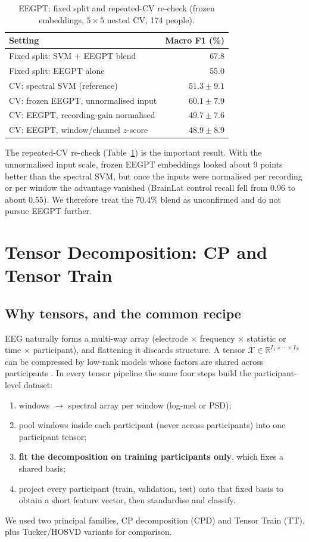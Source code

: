 \documentclass[10pt,twocolumn,a4paper]{article}
\begin{document}
\begin{table}[t]
\centering\small
\caption{EEGPT: fixed split and repeated-CV re-check (frozen embeddings, $5{\times}5$ nested CV, 174 people).}
\label{tab:eegpt}
\begin{tabular}{@{}lr@{}}
\toprule
Setting & Macro F1 (\%)\\
\midrule
Fixed split: SVM + EEGPT blend & 67.8\\
Fixed split: EEGPT alone & 55.0\\
\midrule
CV: spectral SVM (reference) & $51.3\pm9.1$\\
CV: frozen EEGPT, unnormalised input & $60.1\pm7.9$\\
CV: EEGPT, recording-gain normalised & $49.7\pm7.6$\\
CV: EEGPT, window/channel $z$-score & $48.9\pm8.9$\\
\bottomrule
\end{tabular}
\end{table}

The repeated-CV re-check (Table~\ref{tab:eegpt}) is the important result. With the unnormalised input scale, frozen EEGPT embeddings looked about 9 points better than the spectral SVM, but once the inputs were normalised per recording or per window the advantage vanished (BrainLat control recall fell from $0.96$ to about $0.55$). We therefore treat the $70.4\%$ blend as unconfirmed and do not pursue EEGPT further.

\section{Tensor Decomposition: CP and Tensor Train}
\label{sec:tensor}
\subsection{Why tensors, and the common recipe}
\label{sec:tensorrecipe}
EEG naturally forms a multi-way array (electrode $\times$ frequency $\times$ statistic or time $\times$ participant), and flattening it discards structure. A tensor $\mathcal X\in\mathbb R^{I_1\times\cdots\times I_N}$ can be compressed by low-rank models whose factors are shared across participants \cite{kolda2009}. In every tensor pipeline the same four steps build the participant-level dataset:
\begin{enumerate}[label=(\arabic*)]
\item windows $\to$ spectral array per window (log-mel or PSD);
\item pool windows inside each participant (never across participants) into one participant tensor;
\item \textbf{fit the decomposition on training participants only}, which fixes a shared basis;
\item project every participant (train, validation, test) onto that fixed basis to obtain a short feature vector, then standardise and classify.
\end{enumerate}
We used two principal families, CP decomposition (CPD) and Tensor Train (TT), plus Tucker/HOSVD variants for comparison.
\end{document}
